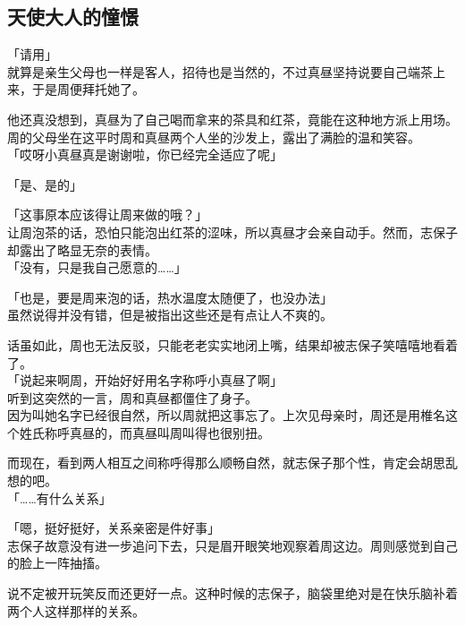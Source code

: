 \subsection{天使大人的憧憬}

「请用」\\

就算是亲生父母也一样是客人，招待也是当然的，不过真昼坚持说要自己端茶上来，于是周便拜托她了。

他还真没想到，真昼为了自己喝而拿来的茶具和红茶，竟能在这种地方派上用场。\\

周的父母坐在这平时周和真昼两个人坐的沙发上，露出了满脸的温和笑容。\\

「哎呀小真昼真是谢谢啦，你已经完全适应了呢」

「是、是的」

「这事原本应该得让周来做的哦？」\\

让周泡茶的话，恐怕只能泡出红茶的涩味，所以真昼才会亲自动手。然而，志保子却露出了略显无奈的表情。\\

「没有，只是我自己愿意的……」

「也是，要是周来泡的话，热水温度太随便了，也没办法」\\

虽然说得并没有错，但是被指出这些还是有点让人不爽的。

话虽如此，周也无法反驳，只能老老实实地闭上嘴，结果却被志保子笑嘻嘻地看着了。\\

「说起来啊周，开始好好用名字称呼小真昼了啊」\\

听到这突然的一言，周和真昼都僵住了身子。\\

因为叫她名字已经很自然，所以周就把这事忘了。上次见母亲时，周还是用椎名这个姓氏称呼真昼的，而真昼叫周叫得也很别扭。

而现在，看到两人相互之间称呼得那么顺畅自然，就志保子那个性，肯定会胡思乱想的吧。\\

「……有什么关系」

「嗯，挺好挺好，关系亲密是件好事」\\

志保子故意没有进一步追问下去，只是眉开眼笑地观察着周这边。周则感觉到自己的脸上一阵抽搐。

说不定被开玩笑反而还更好一点。这种时候的志保子，脑袋里绝对是在快乐脑补着两个人这样那样的关系。\\

